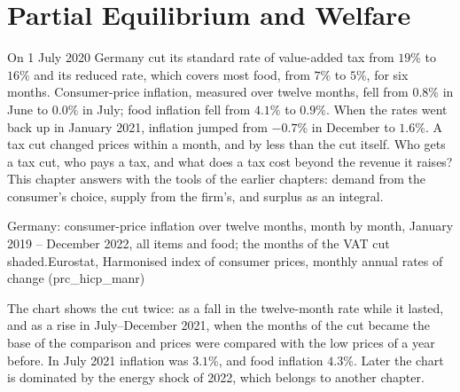 \chapter{Partial Equilibrium and Welfare}\label{ch:b1:partial-equilibrium-welfare}

On 1 July 2020 Germany cut its standard rate of value-added tax from $19\%$
to $16\%$ and its reduced rate, which covers most food, from $7\%$ to $5\%$,
for six months. %
Consumer-price inflation, measured over twelve months, fell from $0.8\%$ in
June to $0.0\%$ in July; food inflation fell from $4.1\%$ to $0.9\%$. When
the rates went back up in January 2021, inflation jumped from $-0.7\%$ in
December to $1.6\%$. %
A tax cut changed prices within a month, and by less than the cut itself.
Who gets a tax cut, who pays a tax, and what does a tax cost beyond the
revenue it raises? This chapter answers with the tools of the earlier
chapters: demand from the consumer's choice, supply from the firm's, and
surplus as an integral.

\begin{openingchart}{Germany: consumer-price inflation over twelve months,
month by month, January 2019 -- December 2022, all items and food; the
months of the VAT cut shaded.}{Eurostat, Harmonised index of consumer prices,
monthly annual rates of change (prc\_hicp\_manr)}
\end{openingchart}

The chart shows the cut twice: as a fall in the twelve-month rate while it
lasted, and as a rise in July--December 2021, when the months of the cut
became the base of the comparison and prices were compared with the low
prices of a year before. In July 2021 inflation was $3.1\%$, and food inflation
$4.3\%$. %
Later the chart is dominated by the energy shock of 2022, which belongs to
another chapter.

